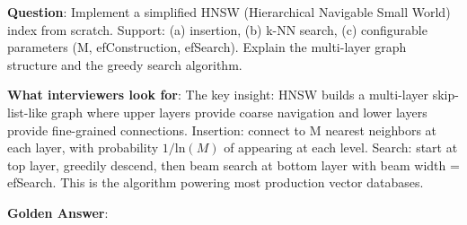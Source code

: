 \textbf{Question}: Implement a simplified HNSW (Hierarchical Navigable Small World) index from scratch. Support: (a) insertion, (b) k-NN search, (c) configurable parameters (M, efConstruction, efSearch). Explain the multi-layer graph structure and the greedy search algorithm.

\textbf{What interviewers look for}: The key insight: HNSW builds a multi-layer skip-list-like graph where upper layers provide coarse navigation and lower layers provide fine-grained connections. Insertion: connect to M nearest neighbors at each layer, with probability $1/\text{ln}(M)$ of appearing at each level. Search: start at top layer, greedily descend, then beam search at bottom layer with beam width = efSearch. This is the algorithm powering most production vector databases.

\textbf{Golden Answer}:

